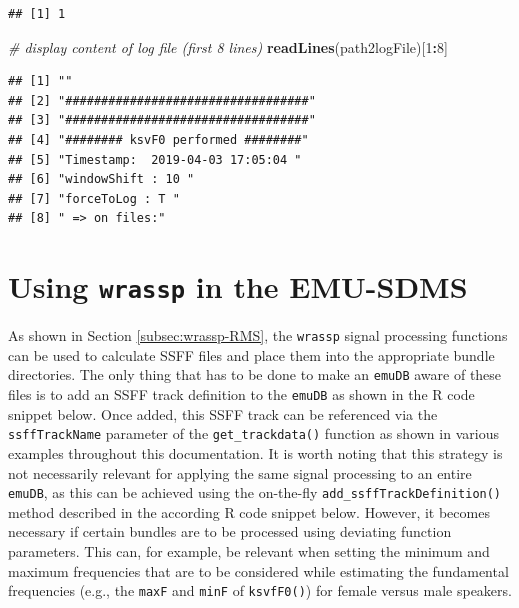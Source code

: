 \documentclass[]{book}
\newenvironment{Shaded}{\begin{snugshade}}{\end{snugshade}}
\newcommand{\CommentTok}[1]{\textcolor[rgb]{0.56,0.35,0.01}{\textit{#1}}}
\newcommand{\DecValTok}[1]{\textcolor[rgb]{0.00,0.00,0.81}{#1}}
\newcommand{\KeywordTok}[1]{\textcolor[rgb]{0.13,0.29,0.53}{\textbf{#1}}}
\newcommand{\NormalTok}[1]{#1}
\newcommand{\OperatorTok}[1]{\textcolor[rgb]{0.81,0.36,0.00}{\textbf{#1}}}
\begin{document}
\begin{verbatim}
## [1] 1
\end{verbatim}

\begin{Shaded}
\begin{Highlighting}[]
\CommentTok{# display content of log file (first 8 lines)}
\KeywordTok{readLines}\NormalTok{(path2logFile)[}\DecValTok{1}\OperatorTok{:}\DecValTok{8}\NormalTok{]}
\end{Highlighting}
\end{Shaded}

\begin{verbatim}
## [1] ""                                  
## [2] "##################################"
## [3] "##################################"
## [4] "######## ksvF0 performed ########" 
## [5] "Timestamp:  2019-04-03 17:05:04 "  
## [6] "windowShift : 10 "                 
## [7] "forceToLog : T "                   
## [8] " => on files:"
\end{verbatim}

\hypertarget{sec:wrassp-emu-sdms}{%
\section{\texorpdfstring{Using \texttt{wrassp} in the EMU-SDMS}{Using wrassp in the EMU-SDMS}}\label{sec:wrassp-emu-sdms}}

As shown in Section \ref{subsec:wrassp-RMS}, the \texttt{wrassp} signal processing functions can be used to calculate SSFF files and place them into the appropriate bundle directories. The only thing that has to be done to make an \texttt{emuDB} aware of these files is to add an SSFF track definition to the \texttt{emuDB} as shown in the R code snippet below. Once added, this SSFF track can be referenced via the \texttt{ssffTrackName} parameter of the \texttt{get\_trackdata()} function as shown in various examples throughout this documentation. It is worth noting that this strategy is not necessarily relevant for applying the same signal processing to an entire \texttt{emuDB}, as this can be achieved using the on-the-fly \texttt{add\_ssffTrackDefinition()} method described in the according R code snippet below. However, it becomes necessary if certain bundles are to be processed using deviating function parameters. This can, for example, be relevant when setting the minimum and maximum frequencies that are to be considered while estimating the fundamental frequencies (e.g., the \texttt{maxF} and \texttt{minF} of \texttt{ksvfF0()}) for female versus male speakers.
\end{document}
